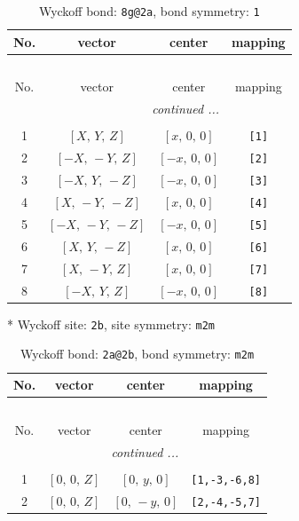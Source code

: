 \documentclass[fleqn,8pt]{jsarticle}
\begin{document}
\renewcommand{\arraystretch}{1.2}
\begin{longtable}{cccc}
\caption{Wyckoff bond: {\tt 8g@2a}, bond symmetry: {\tt 1}}
 \\
 \hline \hline
No. & vector & center & mapping \\ \hline \endfirsthead

\multicolumn{3}{l}{\tablename\ \thetable{}} \\
 \hline \hline
No. & vector & center & mapping \\ \hline \endhead

 \hline \hline
\multicolumn{3}{r}{\footnotesize\it continued ...} \\ \endfoot

 \hline \hline
\multicolumn{3}{r}{} \\ \endlastfoot

1 & $\left[ X,\, Y,\, Z \right]$ & $\left[ x,\, 0,\, 0 \right]$ & {\tt [1]} \\ \hline
2 & $\left[ - X,\, - Y,\, Z \right]$ & $\left[ - x,\, 0,\, 0 \right]$ & {\tt [2]} \\ \hline
3 & $\left[ - X,\, Y,\, - Z \right]$ & $\left[ - x,\, 0,\, 0 \right]$ & {\tt [3]} \\ \hline
4 & $\left[ X,\, - Y,\, - Z \right]$ & $\left[ x,\, 0,\, 0 \right]$ & {\tt [4]} \\ \hline
5 & $\left[ - X,\, - Y,\, - Z \right]$ & $\left[ - x,\, 0,\, 0 \right]$ & {\tt [5]} \\ \hline
6 & $\left[ X,\, Y,\, - Z \right]$ & $\left[ x,\, 0,\, 0 \right]$ & {\tt [6]} \\ \hline
7 & $\left[ X,\, - Y,\, Z \right]$ & $\left[ x,\, 0,\, 0 \right]$ & {\tt [7]} \\ \hline
8 & $\left[ - X,\, Y,\, Z \right]$ & $\left[ - x,\, 0,\, 0 \right]$ & {\tt [8]} \\
\end{longtable}
* Wyckoff site: {\tt 2b}, site symmetry: {\tt m2m}
\renewcommand{\arraystretch}{1.2}
\begin{longtable}{cccc}
\caption{Wyckoff bond: {\tt 2a@2b}, bond symmetry: {\tt m2m}}
 \\
 \hline \hline
No. & vector & center & mapping \\ \hline \endfirsthead

\multicolumn{3}{l}{\tablename\ \thetable{}} \\
 \hline \hline
No. & vector & center & mapping \\ \hline \endhead

 \hline \hline
\multicolumn{3}{r}{\footnotesize\it continued ...} \\ \endfoot

 \hline \hline
\multicolumn{3}{r}{} \\ \endlastfoot

1 & $\left[ 0,\, 0,\, Z \right]$ & $\left[ 0,\, y,\, 0 \right]$ & {\tt [1,-3,-6,8]} \\ \hline
2 & $\left[ 0,\, 0,\, Z \right]$ & $\left[ 0,\, - y,\, 0 \right]$ & {\tt [2,-4,-5,7]} \\
\end{longtable}
\end{document}
